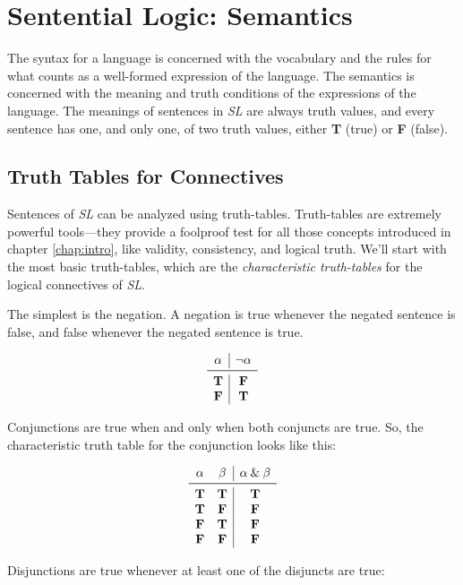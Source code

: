 \documentclass[../logic-text.tex]{subfiles}
\begin{document}
\chapter{Sentential Logic: Semantics}
\label{cha:sent-logic:-semant}

The syntax for a language is concerned with the vocabulary and the rules for what counts as a well-formed expression of the language.
The semantics is concerned with the meaning and truth conditions of the expressions of the language.
The meanings of sentences in \emph{SL} are always truth values, and every sentence has one, and only one, of two truth values, either \textbf{T} (true) or \textbf{F} (false).

\section{Truth Tables for Connectives}
\label{sec:truth-tabl-conn}

Sentences of \emph{SL} can be analyzed using truth-tables.
Truth-tables are extremely powerful tools---they provide a foolproof test for all those concepts introduced in chapter \ref{chap:intro}, like validity, consistency, and logical truth.
We'll start with the most basic truth-tables, which are the \emph{characteristic truth-tables} for the logical connectives of \emph{SL}.


The simplest is the negation.
A negation is true whenever the negated sentence is false, and false whenever the negated sentence is true.

\[
\begin{array}{c|c}
  \alpha & \lneg \alpha \\ \midrule
  \true  & \false  \\
  \false  & \true
\end{array}
\]

Conjunctions are true when and only when both conjuncts are true.
So, the characteristic truth table for the conjunction looks like this:


\[
\begin{array}{cc|c}
  \alpha & \beta & \alpha  \land   \beta \\ \midrule
  \true & \true &  \true  \\
  \true & \false &  \false  \\
  \false & \true &  \false  \\
  \false & \false &  \false
\end{array}
\]


Disjunctions are true whenever at least one of the disjuncts are true:
\end{document}
